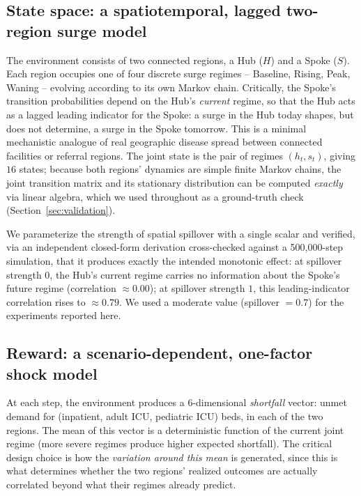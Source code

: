 \documentclass[11pt]{article}
\begin{document}
\subsection{State space: a spatiotemporal, lagged two-region surge model}
The environment consists of two connected regions, a Hub ($H$) and a Spoke ($S$). Each region occupies one of four discrete surge regimes -- Baseline, Rising, Peak, Waning -- evolving according to its own Markov chain. Critically, the Spoke's transition probabilities depend on the Hub's \emph{current} regime, so that the Hub acts as a lagged leading indicator for the Spoke: a surge in the Hub today shapes, but does not determine, a surge in the Spoke tomorrow. This is a minimal mechanistic analogue of real geographic disease spread between connected facilities or referral regions. The joint state is the pair of regimes $(h_t, s_t)$, giving $16$ states; because both regions' dynamics are simple finite Markov chains, the joint transition matrix and its stationary distribution can be computed \emph{exactly} via linear algebra, which we used throughout as a ground-truth check (Section~\ref{sec:validation}).

We parameterize the strength of spatial spillover with a single scalar and verified, via an independent closed-form derivation cross-checked against a 500{,}000-step simulation, that it produces exactly the intended monotonic effect: at spillover strength $0$, the Hub's current regime carries no information about the Spoke's future regime (correlation $\approx 0.00$); at spillover strength $1$, this leading-indicator correlation rises to $\approx 0.79$. We used a moderate value (spillover $=0.7$) for the experiments reported here.

\subsection{Reward: a scenario-dependent, one-factor shock model}
At each step, the environment produces a $6$-dimensional \emph{shortfall} vector: unmet demand for (inpatient, adult ICU, pediatric ICU) beds, in each of the two regions. The mean of this vector is a deterministic function of the current joint regime (more severe regimes produce higher expected shortfall). The critical design choice is how the \emph{variation around this mean} is generated, since this is what determines whether the two regions' realized outcomes are actually correlated beyond what their regimes already predict.
\end{document}
